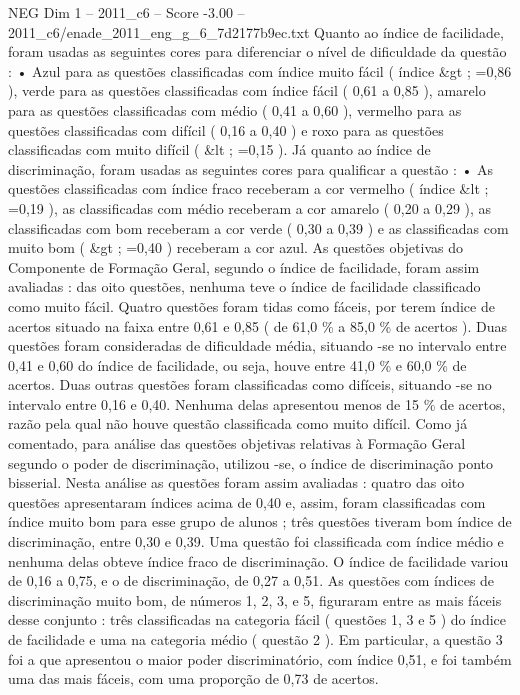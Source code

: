 \begin{textsample}{NEG Dim 1 – 2011\_c6 – Score -3.00 – 2011\_c6/enade\_2011\_eng\_g\_6\_7d2177b9ec.txt}
Quanto ao índice de facilidade, foram usadas as seguintes cores para diferenciar o nível de dificuldade da questão : • Azul para as questões classificadas com índice muito fácil ( índice \&gt ; =0,86 ), verde para as questões classificadas com índice fácil ( 0,61 a 0,85 ), amarelo para as questões classificadas com médio ( 0,41 a 0,60 ), vermelho para as questões classificadas com difícil ( 0,16 a 0,40 ) e roxo para as questões classificadas com muito difícil ( \&lt ; =0,15 ).
Já quanto ao índice de discriminação, foram usadas as seguintes cores para qualificar a questão : • As questões classificadas com índice fraco receberam a cor vermelho ( índice \&lt ; =0,19 ), as classificadas com médio receberam a cor amarelo ( 0,20 a 0,29 ), as classificadas com bom receberam a cor verde ( 0,30 a 0,39 ) e as classificadas com muito bom ( \&gt ; =0,40 ) receberam a cor azul.
As questões objetivas do Componente de Formação Geral, segundo o índice de facilidade, foram assim avaliadas : das oito questões, nenhuma teve o índice de facilidade classificado como muito fácil.
Quatro questões foram tidas como fáceis, por terem índice de acertos situado na faixa entre 0,61 e 0,85 ( de 61,0 \% a 85,0 \% de acertos ).
Duas questões foram consideradas de dificuldade média, situando -se no intervalo entre 0,41 e 0,60 do índice de facilidade, ou seja, houve entre 41,0 \% e 60,0 \% de acertos.
Duas outras questões foram classificadas como difíceis, situando -se no intervalo entre 0,16 e 0,40.
Nenhuma delas apresentou menos de 15 \% de acertos, razão pela qual não houve questão classificada como muito difícil.
Como já comentado, para análise das questões objetivas relativas à Formação Geral segundo o poder de discriminação, utilizou -se, o índice de discriminação ponto bisserial.
Nesta análise as questões foram assim avaliadas : quatro das oito questões apresentaram índices acima de 0,40 e, assim, foram classificadas com índice muito bom para esse grupo de alunos ; três questões tiveram bom índice de discriminação, entre 0,30 e 0,39.
Uma questão foi classificada com índice médio e nenhuma delas obteve índice fraco de discriminação.
O índice de facilidade variou de 0,16 a 0,75, e o de discriminação, de 0,27 a 0,51.
As questões com índices de discriminação muito bom, de números 1, 2, 3, e 5, figuraram entre as mais fáceis desse conjunto : três classificadas na categoria fácil ( questões 1, 3 e 5 ) do índice de facilidade e uma na categoria médio ( questão 2 ).
Em particular, a questão 3 foi a que apresentou o maior poder discriminatório, com índice 0,51, e foi também uma das mais fáceis, com uma proporção de 0,73 de acertos.

\end{textsample}
